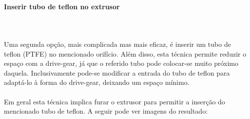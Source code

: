 \documentclass[11pt,a4paper]{article}
\begin{document}
			\paragraph{Inserir tubo de teflon no extrusor}\mbox{}\\\\
Uma segunda opção, mais complicada mas mais eficaz, é inserir um tubo de teflon (PTFE) no mencionado orifício. Além disso, esta técnica permite reduzir o espaço com a drive-gear, já que o referido tubo pode colocar-se muito próximo daquela. Inclusivamente pode-se modificar a entrada do tubo de teflon para adaptá-lo à forma do drive-gear, deixando um espaço mínimo.
\\\\
Em geral esta técnica implica furar o extrusor para permitir a inserção do mencionado tubo de teflon. A seguir pode ver imagens do resultado:
\end{document}
